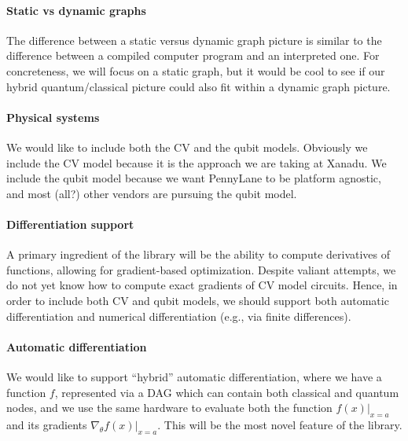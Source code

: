 \documentclass[a4paper,10pt]{article}
\begin{document}
\paragraph{Static vs dynamic graphs}
The difference between a static versus dynamic graph picture is similar to the difference between a compiled computer program and an interpreted one. For concreteness, we will focus on a static graph, but it would be cool to see if our hybrid quantum/classical picture could also fit within a dynamic graph picture. 

\paragraph{Physical systems}
We would like to include both the CV and the qubit models. Obviously we include the CV model because it is the approach we are taking at Xanadu. We include the qubit model because we want PennyLane to be platform agnostic, and most (all?) other vendors are pursuing the qubit model.

\paragraph{Differentiation support} 
A primary ingredient of the library will be the ability to compute derivatives of functions, allowing for gradient-based optimization. Despite valiant attempts, we do not yet know how to compute exact gradients of CV model circuits. Hence, in order to include both CV and qubit models, we should support both automatic differentiation and numerical differentiation (e.g., via finite differences).

\paragraph{Automatic differentiation}
We would like to support ``hybrid'' automatic differentiation, where we have a function $f$, represented via a DAG which can contain both classical and quantum nodes, and we use the same hardware to evaluate both the function $f(x)\big|_{x=a}$ and its gradients $\nabla_\theta f(x)\big|_{x=a}$. This will be the most novel feature of the library.
\end{document}
